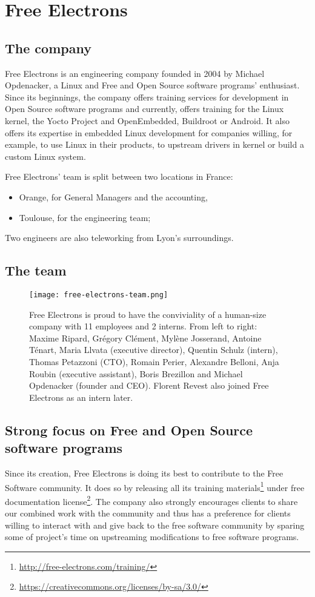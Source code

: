\chapter{Free Electrons}

\section{The company}
Free Electrons is an engineering company founded in 2004 by Michael Opdenacker, a Linux and Free and Open Source software programs' enthusiast. Since its beginnings, the company offers training services for development in Open Source software programs and currently, offers training for the Linux kernel, the Yocto Project and OpenEmbedded, Buildroot or Android. It also offers its expertise in embedded Linux development for companies willing, for example, to use Linux in their products, to upstream drivers in kernel or build a custom Linux system.

Free Electrons' team is split between two locations in France:
\begin{itemize}
  \item Orange, for General Managers and the accounting,
  \item Toulouse, for the engineering team;
\end{itemize}

Two engineers are also teleworking from Lyon's surroundings.

\section{The team}

\begin{figure}[H]
  \centering
  \texttt{[image: free-electrons-team.png]}
  \caption{Free Electrons is proud to have the conviviality of a human-size company with 11 employees and 2 interns. From left to right: Maxime Ripard, Grégory Clément, Mylène Josserand, Antoine Ténart, Maria Llvata (executive director), Quentin Schulz (intern), Thomas Petazzoni (CTO), Romain Perier, Alexandre Belloni, Anja Roubin (executive assistant), Boris Brezillon and Michael Opdenacker (founder and CEO). Florent Revest also joined Free Electrons as an intern later.}
\end{figure}

\section{Strong focus on Free and Open Source software programs}
Since its creation, Free Electrons is doing its best to contribute to the Free Software community. It does so by releasing all its training materials\footnote{\url{http://free-electrons.com/training/}} under free documentation license\footnote{\url{https://creativecommons.org/licenses/by-sa/3.0/}}. The company also strongly encourages clients to share our combined work with the community and thus has a preference for clients willing to interact with and give back to the free software community by sparing some of project's time on upstreaming modifications to free software programs.


